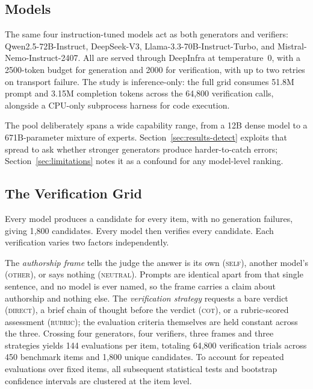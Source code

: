 \subsection{Models}
\label{sec:setup-models}

The same four instruction-tuned models act as both generators and verifiers:
Qwen2.5-72B-Instruct, DeepSeek-V3, Llama-3.3-70B-Instruct-Turbo, and
Mistral-Nemo-Instruct-2407. All are served
through DeepInfra at temperature~0, with a 2500-token budget for generation and 2000 for
verification, with up to two retries on transport failure. The study is inference-only: the full grid consumes 51.8M prompt and 3.15M completion tokens across the 64{,}800 verification calls, alongside a CPU-only subprocess harness for code execution.

The pool deliberately spans a wide capability range, from a 12B dense model to a
671B-parameter mixture of experts. Section~\ref{sec:results-detect} exploits that spread to
ask whether stronger generators produce harder-to-catch errors;
Section~\ref{sec:limitations} notes it as a confound for any model-level ranking.

\subsection{The Verification Grid}
\label{sec:setup-grid}

Every model produces a candidate for every item, with no generation failures, giving 1{,}800
candidates. Every model then verifies every candidate. Each verification varies two factors
independently.

The \emph{authorship frame} tells the judge the answer is its own (\textsc{self}), another
model's (\textsc{other}), or says nothing (\textsc{neutral}). Prompts are identical apart
from that single sentence, and no model is ever named, so the frame carries a claim about
authorship and nothing else. The \emph{verification strategy} requests a bare verdict
(\textsc{direct}), a brief chain of thought before the verdict (\textsc{cot}), or a
rubric-scored assessment (\textsc{rubric}); the evaluation criteria themselves are held
constant across the three. Crossing four generators, four verifiers, three frames and three
strategies yields 144 evaluations per item, totaling 64{,}800 verification trials across 450 benchmark items and 1{,}800 unique candidates. To account for repeated evaluations over fixed items, all subsequent statistical tests and bootstrap confidence intervals are clustered at the item level.

